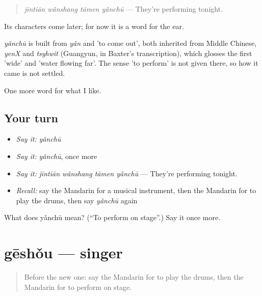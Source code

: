 \begin{quote}
\emph{jīntiān wǎnshang tāmen yǎnchū} — They're performing tonight.
\end{quote}

Its characters come later; for now it is a word for the ear.

\begin{cousinweb}
\emph{yǎnchū} is built from \emph{yǎn} and  'to come out', both inherited from Middle Chinese, \emph{yenX} and \emph{tsyhwit} (Guangyun, in Baxter's transcription), which glosses the first 'wide' and 'water flowing far'. The sense 'to perform' is not given there, so how it came is not settled.
\end{cousinweb}

\begin{grammarlens}[title={What you've built}]
One more word for what I like.
\end{grammarlens}

\subsection*{Your turn}
\begin{itemize}
\raggedright
  \item \emph{Say it:} \emph{yǎnchū}
  \item \emph{Say it:} \emph{yǎnchū}, once more
  \item \emph{Say it:} \emph{jīntiān wǎnshang tāmen yǎnchū} — They're performing tonight.
  \item \emph{Recall:} say the Mandarin for a musical instrument, then the Mandarin for to play the drums, then say \emph{yǎnchū} again
\end{itemize}

\begin{tcolorbox}[breakable,colback=teal!4,colframe=teal!35!black,title={Before you move on}]
What does yǎnchū mean? (\textquotedblleft{}To perform on stage\textquotedblright{}.) Say it once more.
\end{tcolorbox}
\section[gēshǒu]{gēshǒu — singer}

\label{lesson:ZH-C257-geshou}



\begin{quote}
Before the new one: say the Mandarin for to play the drums, then the Mandarin for to perform on stage.
\end{quote}

